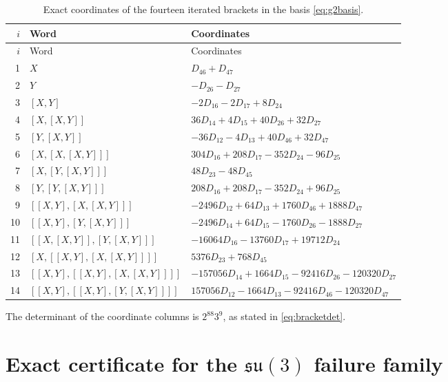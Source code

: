 \documentclass[11pt,a4paper]{article}
\begin{document}
\footnotesize
{}
\begin{longtable}{@{}r p{4.0cm} p{6.8cm}@{}}
\caption{Exact coordinates of the fourteen iterated brackets in the basis \eqref{eq:g2basis}.}\label{tab:brackets}\\
\toprule $i$&Word&Coordinates\\\midrule\endfirsthead
\toprule $i$&Word&Coordinates\\\midrule\endhead
1 & $X$ & $D_{46}+D_{47}$ \\
2 & $Y$ & $-D_{26}-D_{27}$ \\
3 & $[X,Y]$ & $-2D_{16}-2D_{17}+8D_{24}$ \\
4 & $[X,[X,Y]]$ & $36D_{14}+4D_{15}+40D_{26}+32D_{27}$ \\
5 & $[Y,[X,Y]]$ & $-36D_{12}-4D_{13}+40D_{46}+32D_{47}$ \\
6 & $[X,[X,[X,Y]]]$ & $304D_{16}+208D_{17}-352D_{24}-96D_{25}$ \\
7 & $[X,[Y,[X,Y]]]$ & $48D_{23}-48D_{45}$ \\
8 & $[Y,[Y,[X,Y]]]$ & $208D_{16}+208D_{17}-352D_{24}+96D_{25}$ \\
9 & $[[X,Y],[X,[X,Y]]]$ & $-2496D_{12}+64D_{13}+1760D_{46}+1888D_{47}$ \\
10 & $[[X,Y],[Y,[X,Y]]]$ & $-2496D_{14}+64D_{15}-1760D_{26}-1888D_{27}$ \\
11 & $[[X,[X,Y]],[Y,[X,Y]]]$ & $-16064D_{16}-13760D_{17}+19712D_{24}$ \\
12 & $[X,[[X,Y],[X,[X,Y]]]]$ & $5376D_{23}+768D_{45}$ \\
13 & $[[X,Y],[[X,Y],[X,[X,Y]]]]$ & $-157056D_{14}+1664D_{15}-92416D_{26}-120320D_{27}$ \\
14 & $[[X,Y],[[X,Y],[Y,[X,Y]]]]$ & $157056D_{12}-1664D_{13}-92416D_{46}-120320D_{47}$ \\
\bottomrule
\end{longtable}
\normalsize

The determinant of the coordinate columns is $2^{88}3^9$, as stated in \eqref{eq:bracketdet}.

\section{\texorpdfstring{Exact certificate for the $\mathfrak{su}(3)$ failure family}{Exact certificate for the su(3) failure family}}
\label{app:failure-certificate}
\end{document}

